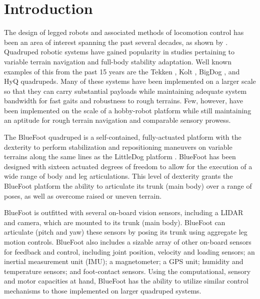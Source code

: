 \chapter{Introduction}
	\label{ch::introduction}

		The design of legged robots and associated methods of locomotion control has been an area of interest spanning the past several decades, as shown by \cite{McGhee1965,Hodgins1991,Altendorfer2001,Kolter2008,Wieber2015}. Quadruped robotic systems have gained popularity in studies pertaining to variable terrain navigation and full-body stability adaptation. Well known examples of this from the past 15 years are the Tekken \cite{Fukuoka2003}, Kolt \cite{Estremera2006}, BigDog \cite{BigDog2008}, and HyQ \cite{Semini2010_PHD} quadrupeds. Many of these systems have been implemented on a larger scale so that they can carry substantial payloads while maintaining adequate system bandwidth for fast gaits and robustness to rough terrains. Few, however, have been implemented on the scale of a hobby-robot platform while still maintaining an aptitude for rough terrain navigation and comparable sensory prowess.

		The BlueFoot quadruped is a self-contained, fully-actuated platform with the dexterity to perform stabilization and repositioning maneuvers on variable terrains along the same lines as the LittleDog platform \cite{Rebula2007}. BlueFoot has been designed with sixteen actuated degrees of freedom to allow for the execution of a wide range of body and leg articulations. This level of dexterity grants the BlueFoot platform the ability to articulate its trunk (main body) over a range of poses, as well as overcome raised or uneven terrain. 

		BlueFoot is outfitted with several on-board vision sensors, including a LIDAR and camera, which are mounted to its trunk (main body). BlueFoot can articulate (\IE pitch and yaw) these sensors by posing its trunk using aggregate leg motion controls. BlueFoot also includes a sizable array of other on-board sensors for feedback and control, including joint position, velocity and loading sensors; an inertial measurement unit (IMU); a magnetometer; a GPS unit; humidity and temperature sensors; and foot-contact sensors. Using the computational, sensory and motor capacities at hand, BlueFoot has the ability to utilize similar control mechanisms to those implemented on larger quadruped systems. 

